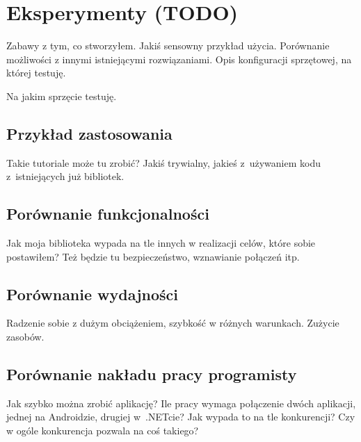 \chapter{Eksperymenty (TODO)}
Zabawy z tym, co stworzyłem. Jakiś sensowny przykład użycia. Porównanie możliwości z innymi istniejącymi rozwiązaniami. Opis konfiguracji sprzętowej, na której testuję.

%
%
%


Na jakim sprzęcie testuję.

\section{Przykład zastosowania}
Takie tutoriale może tu zrobić? Jakiś trywialny, jakieś z~używaniem kodu z~istniejących już bibliotek.

\section{Porównanie funkcjonalności}
Jak moja biblioteka wypada na tle innych w realizacji celów, które sobie postawiłem? Też będzie tu bezpieczeństwo, wznawianie połączeń itp.

\section{Porównanie wydajności}
Radzenie sobie z dużym obciążeniem, szybkość w różnych warunkach. Zużycie zasobów.

\section{Porównanie nakładu pracy programisty}
Jak szybko można zrobić aplikację? Ile pracy wymaga połączenie dwóch aplikacji, jednej na Androidzie, drugiej w~.NETcie? Jak wypada to na tle konkurencji? Czy w ogóle konkurencja pozwala na coś takiego?
